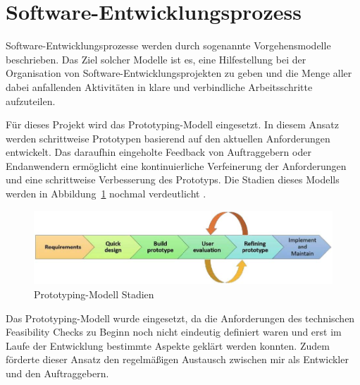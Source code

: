 \section{Software-Entwicklungsprozess}
Software-Entwicklungsprozesse werden durch sogenannte Vorgehensmodelle beschrieben. Das Ziel solcher Modelle ist es, eine Hilfestellung bei der Organisation von Software-Entwicklungsprojekten zu geben und die Menge aller dabei anfallenden Aktivitäten in klare und verbindliche Arbeitsschritte aufzuteilen. 

Für dieses Projekt wird das Prototyping-Modell eingesetzt. In diesem Ansatz werden schrittweise Prototypen basierend auf den aktuellen Anforderungen entwickelt. Das daraufhin eingeholte Feedback von Auftraggebern oder Endanwendern ermöglicht eine kontinuierliche Verfeinerung der Anforderungen und eine schrittweise Verbesserung des Prototyps. Die Stadien dieses Modells werden in Abbildung~\ref{fig:Prototyping-Modell} nochmal verdeutlicht \cite{senarath2021waterfall}.

\begin{figure}[h!]
    \centering
    \includegraphics[]{bilder/Prototyping_Stages.jpg}
    \caption{Prototyping-Modell Stadien}
    \label{fig:Prototyping-Modell}
\end{figure}


Das Prototyping-Modell wurde eingesetzt, da die Anforderungen des technischen Feasibility Checks zu Beginn noch nicht eindeutig definiert waren und erst im Laufe der Entwicklung bestimmte Aspekte geklärt werden konnten. Zudem förderte dieser Ansatz den regelmäßigen Austausch zwischen mir als Entwickler und den Auftraggebern.
